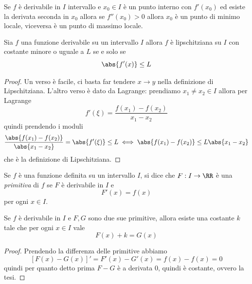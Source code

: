 \documentclass[11pt]{scrartcl}
\begin{document}
	\begin{proposition}
		Se $f$ è derivabile in $I$ intervallo e $x_0\in I$ è un punto interno con $f'(x_0)$ ed esiste la derivata seconda in $x_0$ allora se $f''(x_0)>0$ allora $x_0$ è un punto di minimo locale, viceversa è un punto di massimo locale.
	\end{proposition}
	\begin{proposition}
		Sia $f$ una funzione derivabile su un intervallo $I$ allora $f$ è lipschitziana su $I$ con costante minore o uguale a $L$ se e solo se 
		$$\abs{f'(x)}\le L$$
	\end{proposition}
	\begin{proof}
		Un verso è facile, ci basta far tendere $x\to y$ nella definizione di Lipschitziana. L'altro verso è dato da Lagrange: prendiamo $x_1\ne x_2\in I$ allora per Lagrange
		$$f'(\xi)=\frac{f(x_1)-f(x_2)}{x_1-x_2}$$
		quindi prendendo i moduli
		$$\frac{\abs{f(x_1)-f(x_2)}}{\abs{x_1-x_2}}=\abs{f'(\xi)}\le L \iff \abs{f(x_1)-f(x_2)}\le L\abs{x_1-x_2}$$
		che è la definizione di Lipschitziana.
	\end{proof}
	\begin{definition}[Primitiva]
		Se $f$ è una funzione definita su un intervallo $I$, si dice che $F:I\to \RR$ è una \textit{primitiva} di $f$ se $F$ è derivabile in $I$ e
		$$F'(x)=f(x)$$
		per ogni $x\in I$.
	\end{definition}
	\begin{proposition}
		Se $f$ è derivabile in $I$ e $F,G$ sono due sue primitive, allora esiste una costante $k$ tale che per ogni $x\in I$ vale
		$$F(x)+k=G(x)$$
	\end{proposition}
	\begin{proof}
		Prendendo la differenza delle primitive abbiamo
		$$[F(x)-G(x)]'=F'(x)-G'(x)=f(x)-f(x)=0$$
		quindi per quanto detto prima $F-G$ è a derivata $0$, quindi è costante, ovvero la tesi.
	\end{proof}
\end{document}
